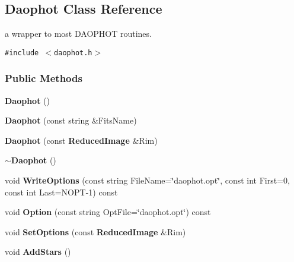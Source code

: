 \subsection{Daophot  Class Reference}
\label{class_daophot}
a wrapper to most DAOPHOT routines. 


{\tt \#include $<$daophot.h$>$}

\subsubsection*{Public Methods}
\begin{CompactItemize}
\item 
{}
{\bf Daophot} ()\label{class_daophot_a0}

\item 
{}
{\bf Daophot} (const string \&Fits\-Name)\label{class_daophot_a1}

\item 
{}
{\bf Daophot} (const {\bf Reduced\-Image} \&Rim)\label{class_daophot_a2}

\item 
{}
{\bf $\sim$Daophot} ()\label{class_daophot_a3}

\item 
{}
void {\bf Write\-Options} (const string File\-Name=\char`\"{}daophot.opt\char`\"{}, const int First=0, const int Last=NOPT-1) const\label{class_daophot_a4}

\item 
{}
void {\bf Option} (const string Opt\-File=\char`\"{}daophot.opt\char`\"{}) const\label{class_daophot_a5}

\item 
{}
void {\bf Set\-Options} (const {\bf Reduced\-Image} \&Rim)\label{class_daophot_a6}

\item 
{}
void {\bf Add\-Stars} ()\label{class_daophot_a7}


\end{CompactItemize}
